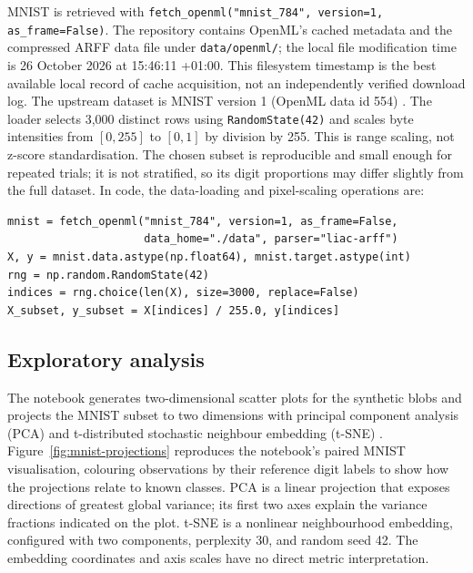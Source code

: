 \documentclass[10pt,a4paper]{article}
\begin{document}
MNIST is retrieved with \texttt{fetch\_openml("mnist\_784", version=1, as\_frame=False)}. The repository contains OpenML's cached metadata and the compressed ARFF data file under \texttt{data/openml/}; the local file modification time is 26 October 2026 at 15:46:11 +01:00. This filesystem timestamp is the best available local record of cache acquisition, not an independently verified download log. The upstream dataset is MNIST version 1 (OpenML data id 554) \cite{lecun1998mnist,openmlmnist}. The loader selects 3,000 distinct rows using \texttt{RandomState(42)} and scales byte intensities from $[0,255]$ to $[0,1]$ by division by 255. This is range scaling, not z-score standardisation. The chosen subset is reproducible and small enough for repeated trials; it is not stratified, so its digit proportions may differ slightly from the full dataset.
In code, the data-loading and pixel-scaling operations are:
\begin{lstlisting}
mnist = fetch_openml("mnist_784", version=1, as_frame=False,
                     data_home="./data", parser="liac-arff")
X, y = mnist.data.astype(np.float64), mnist.target.astype(int)
rng = np.random.RandomState(42)
indices = rng.choice(len(X), size=3000, replace=False)
X_subset, y_subset = X[indices] / 255.0, y[indices]
\end{lstlisting}

\subsection{Exploratory analysis}
The notebook generates two-dimensional scatter plots for the synthetic blobs and projects the MNIST subset to two dimensions with principal component analysis (PCA) and t-distributed stochastic neighbour embedding (t-SNE) \cite{jolliffe2002pca,maaten2008tsne}. Figure~\ref{fig:mnist-projections} reproduces the notebook's paired MNIST visualisation, colouring observations by their reference digit labels to show how the projections relate to known classes. PCA is a linear projection that exposes directions of greatest global variance; its first two axes explain the variance fractions indicated on the plot. t-SNE is a nonlinear neighbourhood embedding, configured with two components, perplexity 30, and random seed 42. The embedding coordinates and axis scales have no direct metric interpretation.
\end{document}
